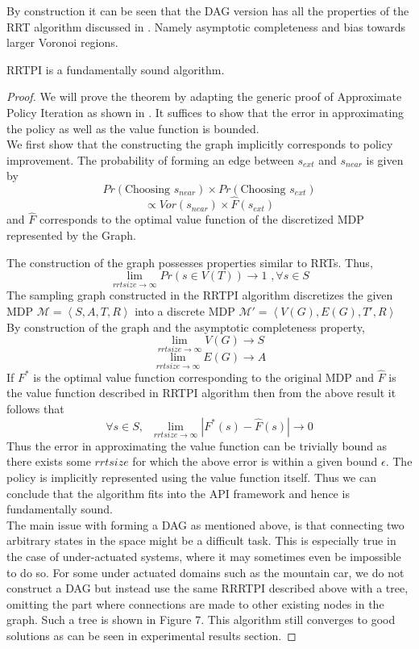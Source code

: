 \documentclass[wcp]{jmlr}
\begin{document}
By construction it can be seen that the DAG version has all the properties of the RRT algorithm discussed in . Namely asymptotic completeness and bias towards larger Voronoi regions.
\begin{theorem}
RRTPI is a fundamentally sound algorithm.
\end{theorem}
\begin{proof}
We will prove the theorem by adapting the generic proof of Approximate Policy Iteration as shown in . It suffices to show that the error in approximating the policy as well as the value function is bounded. \\
We first show that the constructing the graph implicitly corresponds to policy improvement. The probability of forming an edge between $s_{ext}$ and $s_{near}$ is given by 
\[ Pr(\text{Choosing }s_{near}) \times Pr(\text{Choosing }s_{ext}) \]
\[ \varpropto Vor(s_{near})\times \hat{F}(s_{ext}) \] and $\hat{F}$ corresponds to the optimal value function of the discretized MDP represented by the Graph.

The construction of the graph possesses properties similar to RRTs. Thus,\\
\[ \lim_{rrtsize \rightarrow \infty } Pr(s\in V(T)) \rightarrow 1\,\,, \forall s\in S \] 
The sampling graph constructed in the RRTPI algorithm discretizes the given MDP $\mathcal{M}=\left\langle S,A,T,R \right\rangle $ into a discrete MDP $\mathcal{M'}=\left\langle V(G),E(G),T',R \right\rangle $ By construction of the graph and the asymptotic completeness property,
\[ \lim_{rrtsize \rightarrow \infty } V(G) \rightarrow S \]
\[ \lim_{rrtsize \rightarrow \infty } E(G) \rightarrow A \]
If $F^*$ is the optimal value function corresponding to the original MDP and $\hat{F}$ is the value function described in RRTPI algorithm then from the above result it follows that
\[  \forall s \in S,\;\; \lim_{rrtsize \rightarrow \infty } |F^*(s)- \hat{F}(s) | \rightarrow 0 \]
Thus the error in approximating the value function can be trivially bound as there exists some $rrtsize$ for which the above error is within a given bound $\epsilon$. The policy is implicitly represented using the value function itself. Thus we can conclude that the algorithm fits into the API framework and hence is fundamentally sound.\\

 The main issue with forming a DAG as mentioned above, is that connecting two arbitrary states in the space might be a difficult task. This is especially true in the case of under-actuated systems, where it may sometimes even be impossible to do so. For some under actuated domains such as the mountain car, we do not construct a DAG but instead use the same RRRTPI described above with a tree,  omitting the part where connections are made to other existing nodes in the graph. Such a tree is shown in Figure 7. This algorithm still converges to good solutions as can be seen in experimental results section.
\end{proof}
\end{document}
